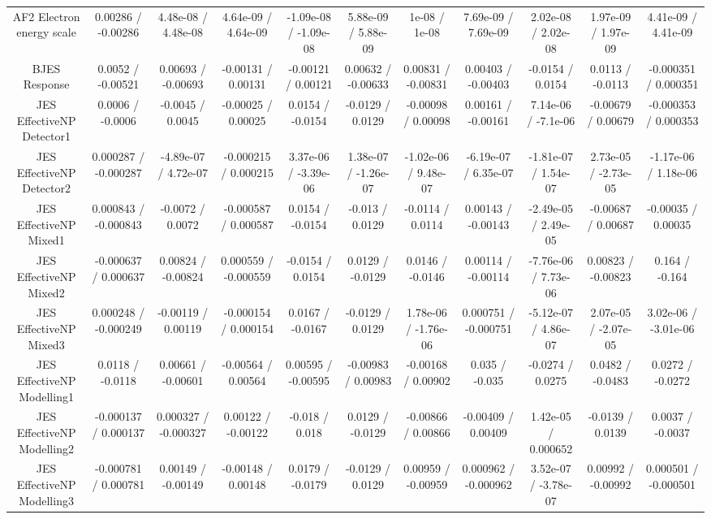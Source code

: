 \begin{table}[htbp]
\begin{center}
\begin{tabular}{|c|c|c|c|c|c|c|c|c|c|c|}
  AF2 Electron energy scale & 0.00286 / -0.00286 & 4.48e-08 / 4.48e-08 & 4.64e-09 / 4.64e-09 & -1.09e-08 / -1.09e-08 & 5.88e-09 / 5.88e-09 & 1e-08 / 1e-08 & 7.69e-09 / 7.69e-09 & 2.02e-08 / 2.02e-08 & 1.97e-09 / 1.97e-09 & 4.41e-09 / 4.41e-09 \\ 
  BJES Response & 0.0052 / -0.00521 & 0.00693 / -0.00693 & -0.00131 / 0.00131 & -0.00121 / 0.00121 & 0.00632 / -0.00633 & 0.00831 / -0.00831 & 0.00403 / -0.00403 & -0.0154 / 0.0154 & 0.0113 / -0.0113 & -0.000351 / 0.000351 \\ 
  JES EffectiveNP Detector1 & 0.0006 / -0.0006 & -0.0045 / 0.0045 & -0.00025 / 0.00025 & 0.0154 / -0.0154 & -0.0129 / 0.0129 & -0.00098 / 0.00098 & 0.00161 / -0.00161 & 7.14e-06 / -7.1e-06 & -0.00679 / 0.00679 & -0.000353 / 0.000353 \\ 
  JES EffectiveNP Detector2 & 0.000287 / -0.000287 & -4.89e-07 / 4.72e-07 & -0.000215 / 0.000215 & 3.37e-06 / -3.39e-06 & 1.38e-07 / -1.26e-07 & -1.02e-06 / 9.48e-07 & -6.19e-07 / 6.35e-07 & -1.81e-07 / 1.54e-07 & 2.73e-05 / -2.73e-05 & -1.17e-06 / 1.18e-06 \\ 
  JES EffectiveNP Mixed1 & 0.000843 / -0.000843 & -0.0072 / 0.0072 & -0.000587 / 0.000587 & 0.0154 / -0.0154 & -0.013 / 0.0129 & -0.0114 / 0.0114 & 0.00143 / -0.00143 & -2.49e-05 / 2.49e-05 & -0.00687 / 0.00687 & -0.00035 / 0.00035 \\ 
  JES EffectiveNP Mixed2 & -0.000637 / 0.000637 & 0.00824 / -0.00824 & 0.000559 / -0.000559 & -0.0154 / 0.0154 & 0.0129 / -0.0129 & 0.0146 / -0.0146 & 0.00114 / -0.00114 & -7.76e-06 / 7.73e-06 & 0.00823 / -0.00823 & 0.164 / -0.164 \\ 
  JES EffectiveNP Mixed3 & 0.000248 / -0.000249 & -0.00119 / 0.00119 & -0.000154 / 0.000154 & 0.0167 / -0.0167 & -0.0129 / 0.0129 & 1.78e-06 / -1.76e-06 & 0.000751 / -0.000751 & -5.12e-07 / 4.86e-07 & 2.07e-05 / -2.07e-05 & 3.02e-06 / -3.01e-06 \\ 
  JES EffectiveNP Modelling1 & 0.0118 / -0.0118 & 0.00661 / -0.00601 & -0.00564 / 0.00564 & 0.00595 / -0.00595 & -0.00983 / 0.00983 & -0.00168 / 0.00902 & 0.035 / -0.035 & -0.0274 / 0.0275 & 0.0482 / -0.0483 & 0.0272 / -0.0272 \\ 
  JES EffectiveNP Modelling2 & -0.000137 / 0.000137 & 0.000327 / -0.000327 & 0.00122 / -0.00122 & -0.018 / 0.018 & 0.0129 / -0.0129 & -0.00866 / 0.00866 & -0.00409 / 0.00409 & 1.42e-05 / 0.000652 & -0.0139 / 0.0139 & 0.0037 / -0.0037 \\ 
  JES EffectiveNP Modelling3 & -0.000781 / 0.000781 & 0.00149 / -0.00149 & -0.00148 / 0.00148 & 0.0179 / -0.0179 & -0.0129 / 0.0129 & 0.00959 / -0.00959 & 0.000962 / -0.000962 & 3.52e-07 / -3.78e-07 & 0.00992 / -0.00992 & 0.000501 / -0.000501 \\ 

\end{tabular}
\end{center}
\end{table}
